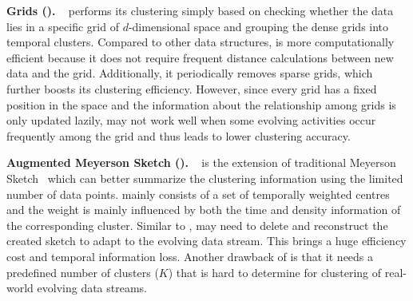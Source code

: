 \textbf{Grids (\Grids).} 
\label{subsec:Grids}
\Grids~\cite{DStream:2007} performs its clustering simply based on checking whether the data lies in a specific grid of $d$-dimensional space and grouping the dense grids into temporal clusters. 
Compared to other data structures, \Grids is more computationally efficient because it does not require frequent distance calculations between new data and the grid. Additionally, it periodically removes sparse grids, which further boosts its clustering efficiency. However, since every grid has a fixed position in the space and the information about the relationship among grids is only updated lazily, \Grids may not work well when some evolving activities occur frequently among the grid and thus leads to lower clustering accuracy.

\textbf{Augmented Meyerson Sketch (\MS).} 
\label{subsec:meyerson_sketch}
\MS~\cite{SL-KMeans:20} is the extension of traditional Meyerson Sketch~\cite{MeyersonSketch:01} which can better summarize the clustering information using the limited number of data points. \MS mainly consists of a set of temporally weighted centres and the weight is mainly influenced by both the time and density information of the corresponding cluster. 
Similar to \CoreT, \MS may need to delete and reconstruct the created sketch to adapt to the evolving data stream. This brings a huge efficiency cost and temporal information loss. 
Another drawback of \MS is that it needs a predefined number of clusters ($K$) that is hard to determine for clustering of real-world 
 evolving data streams.


